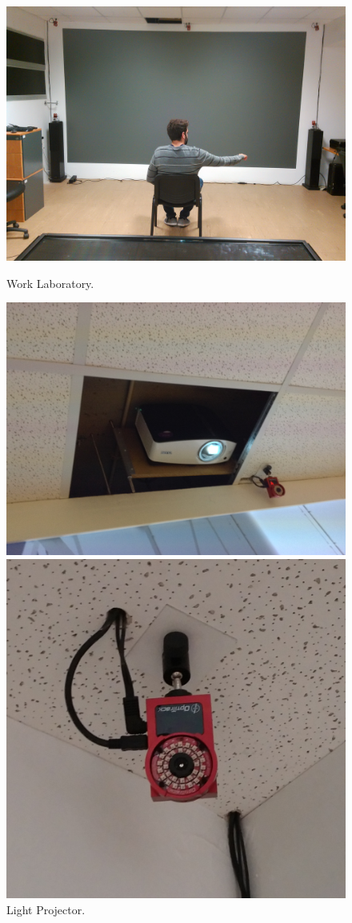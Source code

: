 \begin{figure}[!t]
  \centering
  \includegraphics[width=\linewidth]{imgs/impl/laboratory.jpg}
    \caption{Work Laboratory.}
    \label{fig:laboratory}
    \endminipage\hfill
{}
  \centering
  \includegraphics[width=\linewidth]{imgs/impl/projector.png}
    \caption{Light Projector.}
    \label{fig:projector}
    \endminipage\hfill
{}
  \centering
  \includegraphics[width=0.75\linewidth]{imgs/impl/optitracksensor.png}

\end{figure}
